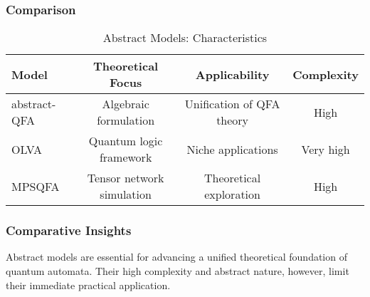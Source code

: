 \subsubsection{Comparison}
\begin{table}[ht]
\centering
\label{tab:abstract}
\begin{tabular}{|l|c|c|c|}
\hline
\textbf{Model} & \textbf{Theoretical Focus} & \textbf{Applicability} & \textbf{Complexity} \\ \hline
abstract-QFA & Algebraic formulation & Unification of QFA theory & High \\ \hline
OLVA        & Quantum logic framework & Niche applications & Very high \\ \hline
MPSQFA      & Tensor network simulation & Theoretical exploration & High \\ \hline
\end{tabular}
\caption{Abstract Models: Characteristics}
\end{table}

\subsubsection{Comparative Insights}
Abstract models are essential for advancing a unified theoretical foundation of quantum automata. Their high complexity and abstract nature, however, limit their immediate practical application.

